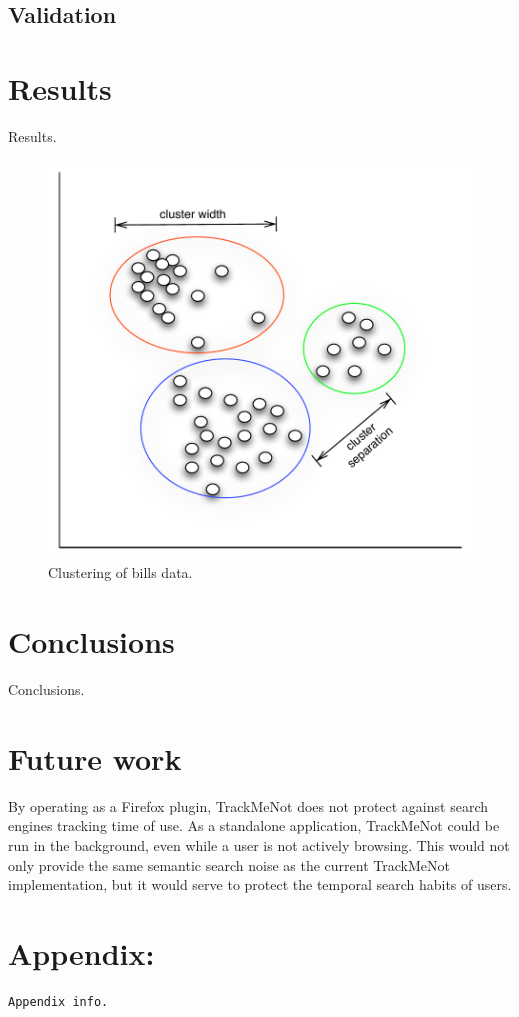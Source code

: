 \documentclass[11pt]{article}
\begin{document}
\begin{multicols}{2}
\subsection{Validation}


\section{Results}
\label{sec:results}

Results. \cite{tmn}

  \begin{figure}[h]
    \centering
    \includegraphics[width=\columnwidth]{clusterbill1}
    \caption{Clustering of bills data.}
    \label{fig:cluster.bill}
  \end{figure}

\section{Conclusions}
\label{sec:conc}
Conclusions.

\section{Future work}
\label{sec:future}
By operating as a Firefox plugin, TrackMeNot does not protect against search engines tracking time of use. As a standalone application, TrackMeNot could be run in the background, even while a user is not actively browsing. This would not only provide the same semantic search noise as the current TrackMeNot implementation, but it would serve to protect the temporal search habits of users.





\end{multicols}
\newpage
\begin{appendix} \label{appendix}
\section*{Appendix:}
{\tiny
\begin{verbatim}
Appendix info.
\end{verbatim}
}
\end{appendix}
\end{document}
